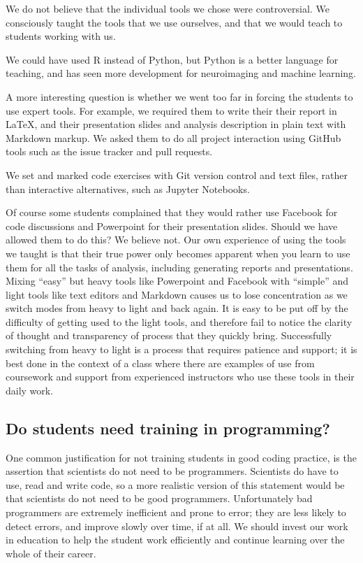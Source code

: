 We do not believe that the individual tools we chose were controversial. We
consciously taught the tools that we use ourselves, and that we would teach to
students working with us.

We could have used R instead of Python, but Python is a better language for
teaching, and has seen more development for neuroimaging and machine learning.

A more interesting question is whether we went too far in forcing the students
to use expert tools.  For example, we required them to write their their
report in \LaTeX, and their presentation slides and analysis description in
plain text with Markdown markup.  We asked them to do all project interaction
using GitHub tools such as the issue tracker and pull requests.

We set and marked code exercises with Git version control and text files,
rather than interactive alternatives, such as Jupyter Notebooks.

Of course some students complained that they would rather use Facebook for
code discussions and Powerpoint for their presentation slides.
Should we have allowed them to do this?  We believe not.  Our own experience
of using the tools we taught is that their true power only becomes apparent
when you learn to use them for all the tasks of analysis, including generating
reports and presentations.  Mixing ``easy'' but heavy tools like Powerpoint
and Facebook with ``simple'' and light tools like text editors and Markdown
causes us to lose concentration as we switch modes from heavy to light and
back again. It is easy to be put off by the difficulty of getting used to the
light tools, and therefore fail to notice the clarity of thought and
transparency of process that they quickly bring.  Successfully switching from
heavy to light is a process that requires patience and support; it is best
done in the context of a class where there are examples of use from coursework
and support from experienced instructors who use these tools in their daily
work.


\subsection{Do students need training in programming?}

One common justification for not training students in good coding practice, is
the assertion that scientists do not need to be programmers.  Scientists do
have to use, read and write code, so a more realistic version of this
statement would be that scientists do not need to be good programmers.
Unfortunately bad programmers are extremely inefficient and prone to error;
they are less likely to detect errors, and improve slowly over time, if at
all.  We should invest our work in education to help the student work
efficiently and continue learning over the whole of their career.


